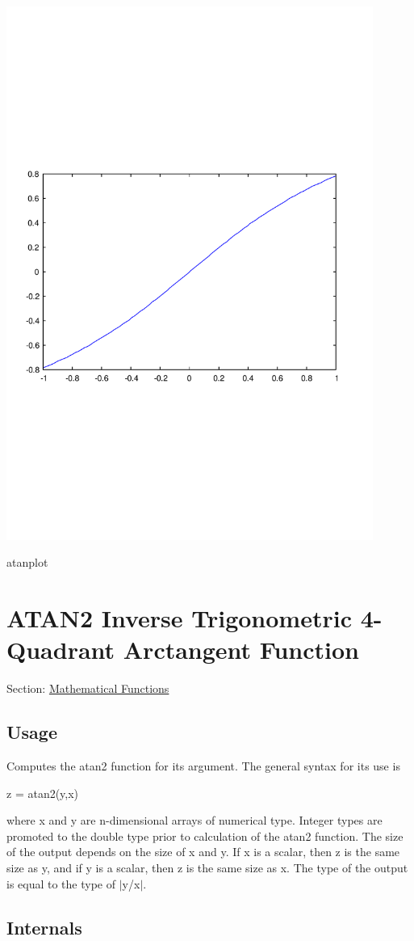  
\begin{DoxyImage}
\includegraphics[width=12cm]{atanplot}
\caption{atanplot}
\end{DoxyImage}
 \hypertarget{mathfunctions_atan2}{}\section{A\-T\-A\-N2 Inverse Trigonometric 4-\/\-Quadrant Arctangent Function}\label{mathfunctions_atan2}
Section\-: \hyperlink{sec_mathfunctions}{Mathematical Functions} \hypertarget{vtkwidgets_vtkxyplotwidget_Usage}{}\subsection{Usage}\label{vtkwidgets_vtkxyplotwidget_Usage}
Computes the {\ttfamily atan2} function for its argument. The general syntax for its use is \begin{DoxyVerb}  z = atan2(y,x)
\end{DoxyVerb}
 where {\ttfamily x} and {\ttfamily y} are {\ttfamily n}-\/dimensional arrays of numerical type. Integer types are promoted to the {\ttfamily double} type prior to calculation of the {\ttfamily atan2} function. The size of the output depends on the size of {\ttfamily x} and {\ttfamily y}. If {\ttfamily x} is a scalar, then {\ttfamily z} is the same size as {\ttfamily y}, and if {\ttfamily y} is a scalar, then {\ttfamily z} is the same size as {\ttfamily x}. The type of the output is equal to the type of $|$y/x$|$. \hypertarget{transforms_svd_Function}{}\subsection{Internals}\label{transforms_svd_Function}
